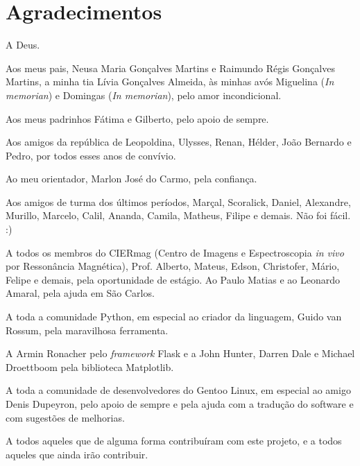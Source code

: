 \chapter*{Agradecimentos}

A Deus.

Aos meus pais, Neusa Maria Gonçalves Martins e Raimundo Régis Gonçalves
Martins, a minha tia Lívia Gonçalves Almeida, às minhas avós Miguelina
(\textit{In memorian}) e Domingas (\textit{In memorian}), pelo amor
incondicional.

Aos meus padrinhos Fátima e Gilberto, pelo apoio de sempre.

Aos amigos da república de Leopoldina, Ulysses, Renan, Hélder, João Bernardo
e Pedro, por todos esses anos de convívio.

Ao meu orientador, Marlon José do Carmo, pela confiança.

Aos amigos de turma dos últimos períodos, Marçal, Scoralick, Daniel,
Alexandre, Murillo, Marcelo, Calil, Ananda, Camila, Matheus, Filipe e
demais. Não foi fácil. :)

A todos os membros do CIERmag (Centro de Imagens e Espectroscopia
\textit{in vivo} por Ressonância Magnética), Prof. Alberto, Mateus, Edson,
Christofer, Mário, Felipe e demais, pela oportunidade de estágio. Ao Paulo
Matias e ao Leonardo Amaral, pela ajuda em São Carlos.

A toda a comunidade Python, em especial ao criador da linguagem, Guido
van Rossum, pela maravilhosa ferramenta.

A Armin Ronacher pelo \textit{framework} Flask e a John Hunter, Darren
Dale e Michael Droettboom pela biblioteca Matplotlib.

A toda a comunidade de desenvolvedores do Gentoo Linux, em especial ao
amigo Denis Dupeyron, pelo apoio de sempre e pela ajuda com a tradução do
software e com sugestões de melhorias.

A todos aqueles que de alguma forma contribuíram com este projeto, e a
todos aqueles que ainda irão contribuir.
